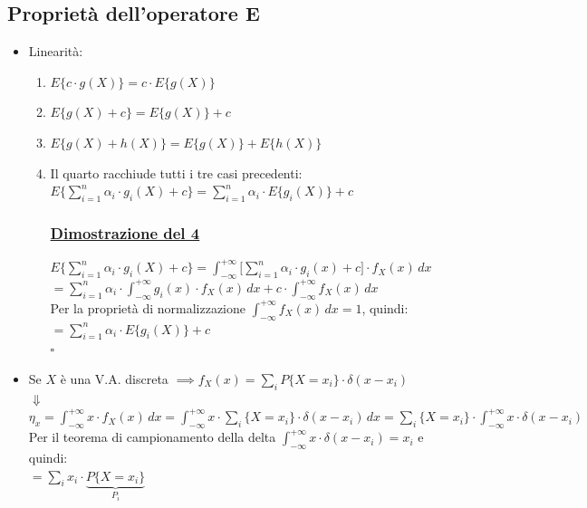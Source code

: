 \documentclass{article}
\begin{document}
\subsection{Proprietà dell'operatore E}
\begin{itemize}
    \item Linearità: 
    \begin{enumerate}
        \item $E \big\{ c \cdot g(X)\big\} = c \cdot E \big\{  g(X)\big\}$
        \item $E \big\{ g(X) + c\big\} = E \big\{  g(X)\big\} +c$
        \item $E \big\{ g(X) + h(X)\big\} = E \big\{  g(X)\big\} + E \big\{  h(X)\big\}$
        \item Il quarto racchiude tutti i tre casi precedenti: $E \big\{ \sum_{i=1}^{n} \alpha_i \cdot g_i(X) +c\big\} = \sum_{i=1}^{n} \alpha_i \cdot E \big\{ g_i(X)\big\} + c$
        \subsubsection{\underline{Dimostrazione del 4}}
        $E \big\{ \sum_{i=1}^{n} \alpha_i \cdot g_i(X) +c\big\} = \int_{-\infty}^{+\infty} \Big[ \sum_{i=1}^{n} \alpha_i \cdot g_i(x) + c\Big] \cdot f_X(x) \,dx$ \\
        $= \sum_{i=1}^{n} \alpha_i \cdot \int_{-\infty}^{+\infty} g_i(x) \cdot f_X(x) \,dx + c \cdot \int_{-\infty}^{+\infty}  f_X(x) \,dx$ \\
        Per la proprietà di normalizzazione $\int_{-\infty}^{+\infty}  f_X(x) \,dx = 1$, quindi: \\
        $= \sum_{i=1}^{n} \alpha_i \cdot E \big\{ g_i(X)\big\} +c$ \\
        \hspace*{0pt}\hfill $\square$ 
    \end{enumerate}
    \item Se $X$ è una V.A. discreta $\implies f_X(x) = \sum_i P \big\{ X = x_i \big\} \cdot \delta(x-x_i)$ \\
    $\Downarrow$ \\
    $\eta_x = \int_{-\infty}^{+\infty} x \cdot f_X(x) \, dx = \int_{-\infty}^{+\infty} x \cdot \sum_i \big\{ X = x_i \big\} \cdot \delta(x-x_i) \,dx = \sum_i \big\{ X = x_i \big\} \cdot \int_{-\infty}^{+\infty} x \cdot \delta(x-x_i)$ \\
    Per il teorema di campionamento della delta $\int_{-\infty}^{+\infty} x \cdot \delta(x-x_i) = x_i$ e quindi: \\
    $= \sum_i x_i \cdot \underset{P_i}{\underbrace{P \big\{X = x_i\big\}}}$
\end{itemize}
\clearpage
\end{document}
